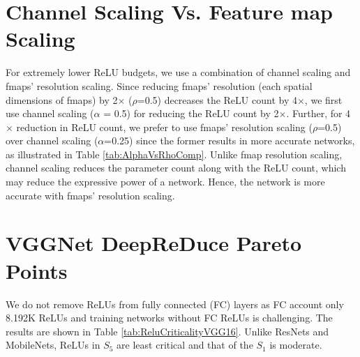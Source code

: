 
%
%


\section{Channel Scaling Vs. Feature map Scaling} \label{secAppendix:ChannelVsFmapScaling}


For extremely lower ReLU budgets, we use a combination of channel scaling and fmaps' resolution scaling. Since reducing  fmaps' resolution (each spatial dimensions of fmaps) by 2$\times$ ($\rho$=0.5) decreases the ReLU count by 4$\times$, we first use channel scaling ($\alpha$ = 0.5) for reducing the ReLU count by 2$\times$. Further, for 4$\times$ reduction in ReLU count, we prefer to use fmaps' resolution scaling ($\rho$=0.5) over channel scaling ($\alpha$=0.25) since the former results in more accurate networks, as illustrated in Table \ref{tab:AlphaVsRhoComp}. Unlike fmap resolution scaling, channel scaling reduces the parameter count along with the ReLU count, which may reduce the expressive power of a network. Hence, the network is more accurate with fmaps' resolution scaling.  
  





\section{VGGNet DeepReDuce Pareto Points} \label{SecAppendix:ParetoPointsVGG16}

We do not remove ReLUs from fully connected (FC) layers as FC account only 8.192K ReLUs and training networks without FC ReLUs is challenging. The results are shown in Table \ref{tab:ReluCriticalityVGG16}. Unlike ResNets and MobileNets, ReLUs in $S_5$ are least critical and that of the $S_1$ is moderate. 

